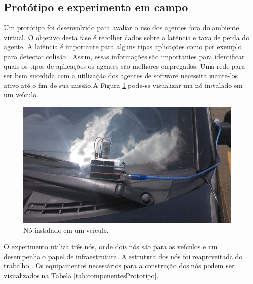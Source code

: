 \subsection{Protótipo e experimento em campo}
\label{subsec:prototipoExperimento}

Um protótipo foi desenvolvido para avaliar o uso dos agentes fora do ambiente virtual. O objetivo desta fase é recolher dados sobre a latência e taxa de perda do agente. A latência é importante para alguns tipos aplicações como por exemplo para detectar colisão \cite{santanaMestrado:2014}. Assim, essas informações são importantes para identificar quais os tipos de aplicações os agentes são melhores empregados. Uma rede para ser bem sucedida com a utilização dos agentes de software necessita mante-los ativo até o fim de sua missão.A Figura \ref{fig:noInstaladoVeiculo} pode-se visualizar um nó instalado em um veículo.

\begin{figure}[htbp]
	\centering
	\includegraphics[scale=0.06]{metodologia/figuras/noInstaladoVeiculo.jpg}
	\caption{Nó instalado em um veículo.}
	\label{fig:noInstaladoVeiculo}
\end{figure}

O experimento utiliza três nós, onde dois nós são para os veículos e um desempenha o papel de infraestrutura. A estrutura dos nós foi reaproveitada do trabalho \cite{santanaMestrado:2014}. Os equipamentos necessários para a construção dos nós podem ser visualizados na Tabela \ref{tab:componentesPrototipo}. 

